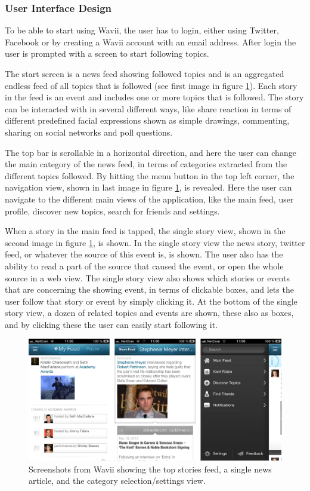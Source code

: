 \subsubsection{User Interface Design}
To be able to start using Wavii, the user has to login, either using Twitter, Facebook or by creating a Wavii account with an email address. After login the user is prompted with a screen to start following topics.

The start screen is a news feed showing followed topics and is an aggregated endless feed of all topics that is followed (see first image in figure \ref{screenshots_wavii}). Each story in the feed is an event and includes one or more topics that is followed. The story can be interacted with in several different ways, like share reaction in terms of different predefined facial expressions shown as simple drawings, commenting, sharing on social networks and poll questions.

The top bar is scrollable in a horizontal direction, and here the user can change the main category of the news feed, in terms of categories extracted from the different topics followed. By hitting the menu button in the top left corner, the navigation view, shown in last image in figure \ref{screenshots_wavii}, is revealed. Here the user can navigate to the different main views of the application, like the main feed, user profile, discover new topics, search for friends and settings.

When a story in the main feed is tapped, the single story view, shown in the second image in figure \ref{screenshots_wavii}, is shown. In the single story view the news story, twitter feed, or whatever the source of this event is, is shown. The user also has the ability to read a part of the source that caused the event, or open the whole source in a web view. The single story view also shows which stories or events that are concerning the showing event, in terms of clickable boxes, and lets the user follow that story or event by simply clicking it. At the bottom of the single story view, a dozen of related topics and events are shown, these also as boxes, and by clicking these the user can easily start following it.

\begin{figure}[!htbp]
\centering
\includegraphics[width=130mm]{GFX/screenshots/wavii.png}
\caption{Screenshots from Wavii showing the top stories feed, a single news article, and the category selection/settings view.}
\label{screenshots_wavii}
\end{figure}

